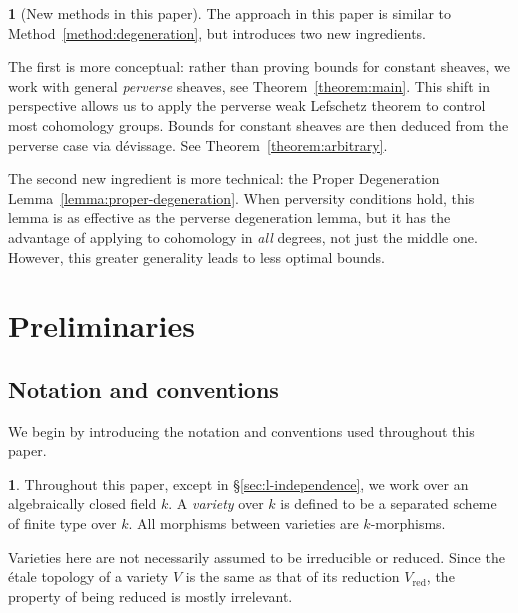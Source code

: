 \documentclass[english]{smfart}
\theoremstyle{remark}
\theoremstyle{plain}
\theoremstyle{definition}
\numberwithin{equation}{remark}
\theoremstyle{void}
\newtheorem{situation}[remark]{}
\begin{document}
\begin{situation}[New methods in this paper]
The approach in this paper is similar to
Method~\ref{method:degeneration}, but introduces two new ingredients.

The first is more conceptual: rather than proving bounds for constant
sheaves, we work with general \emph{perverse} sheaves, see
Theorem~\ref{theorem:main}.  This shift in perspective allows us to
apply the perverse weak Lefschetz theorem to control most cohomology
groups.  Bounds for constant sheaves are then deduced from the
perverse case via dévissage.  See Theorem~\ref{theorem:arbitrary}.

The second new ingredient is more technical: the Proper Degeneration
Lemma~\ref{lemma:proper-degeneration}.  When perversity conditions
hold, this lemma is as effective as the perverse degeneration lemma,
but it has the advantage of applying to cohomology in \emph{all}
degrees, not just the middle one.  However, this greater generality
leads to less optimal bounds.
\end{situation}


\section{Preliminaries}
\label{sec:preliminaries}


\renewcommand{\theremark}{\thesubsection.\arabic{remark}}


\subsection{Notation and conventions}

We begin by introducing the notation and conventions used
throughout this paper.

\begin{situation}
\label{situation:conventions}
Throughout this paper, except in \S\ref{sec:l-independence}, we work
over an algebraically closed field \(k\).  A \emph{variety} over \(k\)
is defined to be a separated scheme of finite type over \(k\).  All
morphisms between varieties are \(k\)-morphisms.

Varieties here are not necessarily assumed to be irreducible or
reduced.  Since the étale topology of a variety \(V\) is the same as
that of its reduction \(V_{\mathrm{red}}\), the property of being
reduced is mostly irrelevant.
\end{situation}
\end{document}
